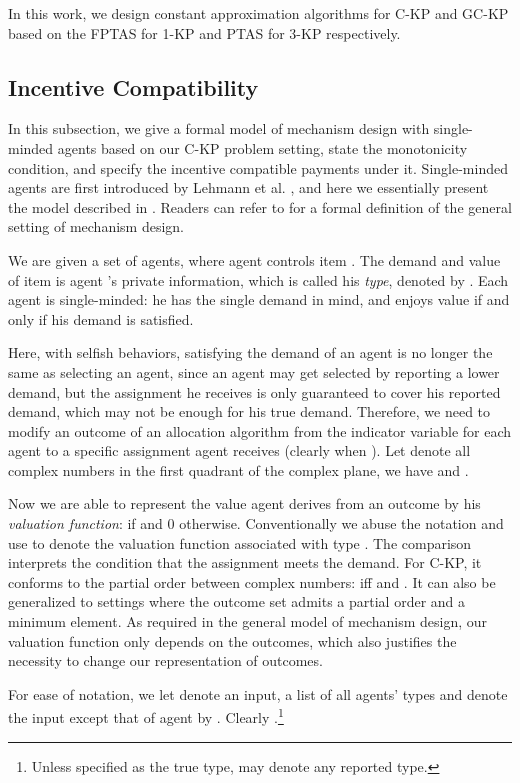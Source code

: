 \documentclass{aamas2013}
\begin{document}
In this work, we design constant  approximation algorithms for C-KP and GC-KP based on the FPTAS for 1-KP and PTAS for 3-KP respectively. 
\subsection{Incentive Compatibility}\label{subsec:ic}
\noindent
In this subsection, we give a formal model of mechanism design with single-minded agents based on our C-KP problem setting, state the monotonicity condition, and specify the incentive compatible payments under it.  Single-minded agents are first introduced by Lehmann et al. \cite{LOS99mono}, and here we essentially present the model described in \cite{BKV05KS}.  Readers can refer to \cite{N07book, NR01alg} for a formal definition of the general setting of mechanism design.

We are given a set  of agents, where agent  controls item .  The demand and value of item  is agent 's private information, which is called his {\em type}, denoted by .   Each agent  is single-minded: he has the single demand  in mind, and enjoys value  if and only if his demand is satisfied.  

Here, with selfish behaviors, satisfying the demand of an agent is no longer the same as selecting an agent, since an agent may get selected by reporting a lower demand, but the assignment he receives is only guaranteed to cover his reported demand, which may not be enough for his true demand.  Therefore, we need to modify an outcome  of an allocation algorithm from the indicator variable  for each agent  to a specific assignment  agent  receives (clearly  when ).  Let  denote all complex numbers in the first quadrant of the complex plane, we have  and .  

Now we are able to represent the value agent  derives from an outcome  by his {\em valuation function}:  if  and 0 otherwise.  Conventionally we abuse the notation and use  to denote the valuation function associated with type .  The comparison  interprets the condition that the assignment meets the demand.
For C-KP, it conforms to the partial order between complex numbers:  iff  and .  It can also be generalized to settings where the outcome set admits a partial order and a minimum element.  As required in the general model of mechanism design, our valuation function only depends on the outcomes, which also justifies the necessity to change our representation of outcomes.  

For ease of notation, we let  denote an input, a list of all agents' types  and denote the input except that of agent  by .  Clearly .\footnote{Unless specified as the true type,  may denote any reported type.}
\end{document}

